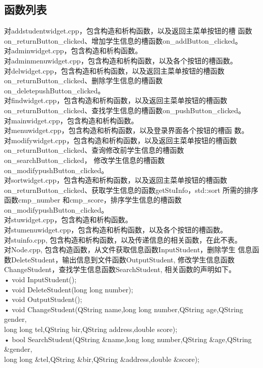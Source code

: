\documentclass[
  ]{nwafuprojrep}
\begin{document}
\subsection{函数列表}
对addstudentwidget.cpp，包含构造和析构函数，以及返回主菜单按钮的槽
函数on\_returnButton\_clicked、增加学生信息的槽函数on\_addButton\_clicked。\\
对adminwidget.cpp，包含构造和析构函数。\\
对adminmenuwidget.cpp，包含构造和析构函数，以及各个按钮的槽函数。\\
对delwidget.cpp，包含构造和析构函数，以及返回主菜单按钮的槽函数
on\_returnButton\_clicked、删除学生信息的槽函数on\_deletepushButton\_clicked。\\
对findwidget.cpp，包含构造和析构函数，以及返回主菜单按钮的槽函数
on\_returnButton\_clicked、查找学生信息的槽函数on\_pushButton\_clicked。\\
对mainwidget.cpp，包含构造和析构函数。\\
对menuwidget.cpp，包含构造和析构函数，以及登录界面各个按钮的槽函
数。\\
对modifywidget.cpp，包含构造和析构函数，以及返回主菜单按钮的槽函数
on\_returnButton\_clicked、查询修改前学生信息的槽函数on\_searchButton\_clicked，
修改学生信息的槽函数on\_modifypushButton\_clicked。\\
对sortwidget.cpp，包含构造和析构函数，以及返回主菜单按钮的槽函数
on\_returnButton\_clicked、获取学生信息的函数getStuInfo，std::sort 所需的排序
函数cmp\_number 和cmp\_score，排序学生信息的槽函数on\_modifypushButton\_clicked。\\
对stuwidget.cpp，包含构造和析构函数。\\
对stumenuwidget.cpp，包含构造和析构函数，以及各个按钮的槽函数。\\
对stuinfo.cpp, 包含构造和析构函数，以及传递信息的相关函数，在此不表。\\
对Node.cpp, 包含构造函数，从文件获取信息函数InputStudent，删除学生
信息函数DeleteStudent，输出信息到文件函数OutputStudent, 修改学生信息函数
ChangeStudent，查找学生信息函数SearchStudent, 相关函数的声明如下。\\
• void InputStudent();\\
• void DeleteStudent(long long number);\\
• void OutputStudent();\\
• void ChangeStudent(QString name,long long number,QString age,QString gender,\\
long long tel,QString bir,QString address,double score);\\
• bool SearchStudent(QString \&name,long long number,QString \&age,QString \&gender,\\
long long \&tel,QString \&bir,QString \&address,double \&score);\\
\end{document}
